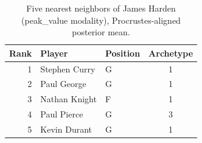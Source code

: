 \begin{table}[htbp]
  \centering\small
  \begin{tabular}{rllc}
    \toprule
    Rank & Player & Position & Archetype \\
    \midrule
    1 & Stephen Curry & G & 1 \\
    2 & Paul George & G & 1 \\
    3 & Nathan Knight & F & 1 \\
    4 & Paul Pierce & G & 3 \\
    5 & Kevin Durant & G & 1 \\
    \bottomrule
  \end{tabular}
  \caption{Five nearest neighbors of James Harden (peak_value modality), Procrustes-aligned posterior mean.}
  \label{tab:James_Harden_neighbors_peak_value}
\end{table}

